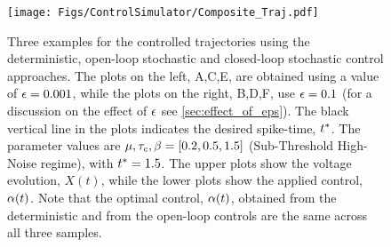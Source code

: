 \documentclass[12pt]{iopart}
\begin{document}
\begin{figure}[h]
\begin{center}
\texttt{[image: Figs/ControlSimulator/Composite\_Traj.pdf]} 
\caption[]{Three examples for the controlled trajectories using the
deterministic, open-loop stochastic and closed-loop stochastic control approaches.
The plots on the left, A,C,E, are obtained using a value of ${\epsilon}=0.001$,
while the plots on the right, B,D,F, use ${\epsilon}=0.1$ (for a discussion on the
effect of ${\epsilon}$ see \cref{sec:effect_of_eps}). The black vertical line in the plots indicates the
desired spike-time, ${ t^* }$. The parameter values are ${\mu }, { \tau_{c} }, {\beta} = [0.2, 0.5,  1.5]$ (Sub-Threshold
High-Noise regime), with ${ t^* } = 1.5$. 
The upper plots show the voltage evolution, $X(t)$, while the lower
plots show the applied control, ${\alpha}(t)$. Note that the optimal control, ${\alpha}(t)$, obtained from
the deterministic and from the open-loop controls are the same across all three
samples.}
\label{fig:control_trajectories_examples}   
\end{center}  
\end{figure}


\clearpage
\end{document}
